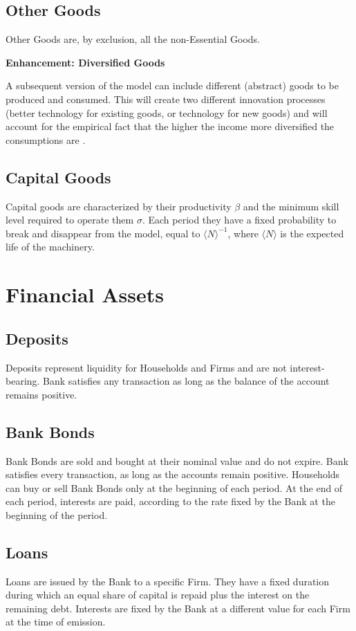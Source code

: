\documentclass[a4paper, headings=standardclasses]{scrartcl}
\newenvironment{enh}[1][]{\begin{framed}\noindent\textbf{Enhancement: #1}\par}{\end{framed}}
\begin{document}
\subsection{Other Goods}
Other Goods are, by exclusion, all the non-Essential Goods.

\begin{enh}[Diversified Goods]
	A subsequent version of the model can include different (abstract) goods to be produced and consumed. This will create two different innovation processes (better technology for existing goods, or technology for new goods) and will account for the empirical fact that the higher the income more diversified the consumptions are \parencite[cfr.][§2]{didomenico2022}.
\end{enh}

\subsection{Capital Goods}
Capital goods are characterized by their productivity $\beta$ and the minimum skill level required to operate them $\sigma$. Each period they have a fixed probability to break and disappear from the model, equal to $\langle N \rangle^{-1}$, where $\langle N \rangle$ is the expected life of the machinery.

\section{Financial Assets}

\subsection{Deposits}
Deposits represent liquidity for Households and Firms and are not interest-bearing. Bank satisfies any transaction as long as the balance of the account remains positive.

\subsection{Bank Bonds}
Bank Bonds are sold and bought at their nominal value and do not expire. Bank satisfies every transaction, as long as the accounts remain positive. Households can buy or sell Bank Bonds only at the beginning of each period. At the end of each period, interests are paid, according to the rate fixed by the Bank at the beginning of the period.

\subsection{Loans}
Loans are issued by the Bank to a specific Firm. They have a fixed duration during which an equal share of capital is repaid plus the interest on the remaining debt. Interests are fixed by the Bank at a different value for each Firm at the time of emission.
\end{document}
